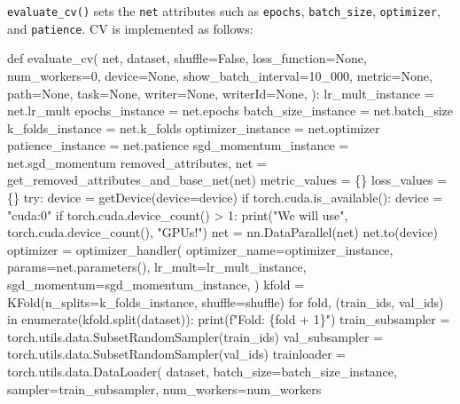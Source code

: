 \documentclass[
  letterpaper,
  DIV=11,
  numbers=noendperiod]{scrreprt}
\newenvironment{Shaded}{\begin{snugshade}}{\end{snugshade}}
\newcommand{\NormalTok}[1]{\textcolor[rgb]{0.00,0.23,0.31}{#1}}
\begin{document}
\texttt{evaluate\_cv()} sets the \texttt{net} attributes such as
\texttt{epochs}, \texttt{batch\_size}, \texttt{optimizer}, and
\texttt{patience}. CV is implemented as follows:

\begin{Shaded}
\begin{Highlighting}[]
\NormalTok{def evaluate\_cv(}
\NormalTok{    net,}
\NormalTok{    dataset,}
\NormalTok{    shuffle=False,}
\NormalTok{    loss\_function=None,}
\NormalTok{    num\_workers=0,}
\NormalTok{    device=None,}
\NormalTok{    show\_batch\_interval=10\_000,}
\NormalTok{    metric=None,}
\NormalTok{    path=None,}
\NormalTok{    task=None,}
\NormalTok{    writer=None,}
\NormalTok{    writerId=None,}
\NormalTok{):}
\NormalTok{    lr\_mult\_instance = net.lr\_mult}
\NormalTok{    epochs\_instance = net.epochs}
\NormalTok{    batch\_size\_instance = net.batch\_size}
\NormalTok{    k\_folds\_instance = net.k\_folds}
\NormalTok{    optimizer\_instance = net.optimizer}
\NormalTok{    patience\_instance = net.patience}
\NormalTok{    sgd\_momentum\_instance = net.sgd\_momentum}
\NormalTok{    removed\_attributes, net = get\_removed\_attributes\_and\_base\_net(net)}
\NormalTok{    metric\_values = \{\}}
\NormalTok{    loss\_values = \{\}}
\NormalTok{    try:}
\NormalTok{        device = getDevice(device=device)}
\NormalTok{        if torch.cuda.is\_available():}
\NormalTok{            device = "cuda:0"}
\NormalTok{            if torch.cuda.device\_count() \textgreater{} 1:}
\NormalTok{                print("We will use", torch.cuda.device\_count(), "GPUs!")}
\NormalTok{                net = nn.DataParallel(net)}
\NormalTok{        net.to(device)}
\NormalTok{        optimizer = optimizer\_handler(}
\NormalTok{            optimizer\_name=optimizer\_instance,}
\NormalTok{            params=net.parameters(),}
\NormalTok{            lr\_mult=lr\_mult\_instance,}
\NormalTok{            sgd\_momentum=sgd\_momentum\_instance,}
\NormalTok{        )}
\NormalTok{        kfold = KFold(n\_splits=k\_folds\_instance, shuffle=shuffle)}
\NormalTok{        for fold, (train\_ids, val\_ids) in enumerate(kfold.split(dataset)):}
\NormalTok{            print(f"Fold: \{fold + 1\}")}
\NormalTok{            train\_subsampler = torch.utils.data.SubsetRandomSampler(train\_ids)}
\NormalTok{            val\_subsampler = torch.utils.data.SubsetRandomSampler(val\_ids)}
\NormalTok{            trainloader = torch.utils.data.DataLoader(}
\NormalTok{                dataset, batch\_size=batch\_size\_instance, }
\NormalTok{                sampler=train\_subsampler, num\_workers=num\_workers}

\end{Highlighting}
\end{Shaded}
\end{document}
